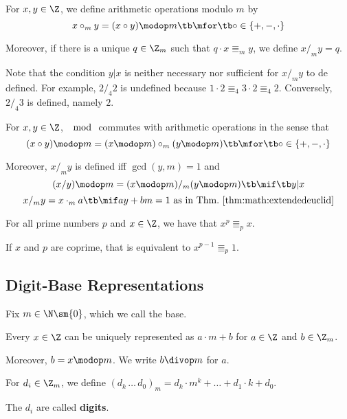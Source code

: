 \begin{definition}\label{def:math:moduloarith}
For $x,y\in\Z$, we define arithmetic operations modulo $m$ by \[x\circ_m y = (x\circ y)\modop m \tb\mfor\tb \circ \in\{+,-,\cdot\}\]

Moreover, if there is a unique $q\in\Z_m$ such that $q\cdot x\Equiv_m y$, we define $x/_m y=q$.
\end{definition}

Note that the condition $y|x$ is neither necessary nor sufficient for $x/_m y$ to de defined.
For example, $2/_4 2$ is undefined because $1\cdot 2\Equiv_4 3\cdot 2\Equiv_4 2$.
Conversely, $2/_4 3$ is defined, namely $2$.

\begin{theorem}\label{thm:math:moduloarith}
For $x,y\in\Z$, $\mod$ commutes with arithmetic operations in the sense that
 \[(x\circ y)\modop m=(x\modop m)\circ_m (y\modop m) \tb\mfor\tb \circ \in\{+,-,\cdot\}\]

Moreover, $x/_m y$ is defined iff $\gcd(y,m)=1$ and
 \[(x/y)\modop m=(x \modop m)/_m (y\modop m) \tb\mif\tb y|x\]
 \[x/_m y=x\cdot_m a \tb\mif ay+bm=1 \text{ as in Thm.~\ref{thm:math:extendedeuclid}}\]
\end{theorem}

\begin{theorem}\label{thm:math:fermatlittle}
For all prime numbers $p$ and $x\in\Z$, we have that $x^p\Equiv_p x$.

If $x$ and $p$ are coprime, that is equivalent to $x^{p-1}\Equiv_p 1$.
\end{theorem}

\subsection{Digit-Base Representations}\label{sec:math:base}

Fix $m\in \N\sm\{0\}$, which we call the base.
\medskip

\begin{theorem}
Every $x\in\Z$ can be uniquely represented as $a\cdot m+b$ for $a\in\Z$ and $b\in\Z_m$.

Moreover, $b=x\modop m$.
We write $b\divop m$ for $a$.
\end{theorem}

\begin{definition}\label{def:math:base}
For $d_i\in\Z_m$, we define $(d_k\,\ldots\,d_0)_m =d_k\cdot m^k+\ldots+d_1\cdot k+d_0$.

The $d_i$ are called \textbf{digits}.
\end{definition}

